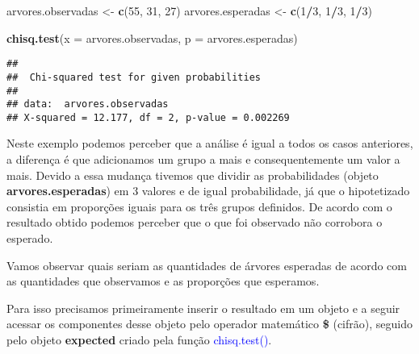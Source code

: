 \documentclass[14pt,titlepage, oneside, openany, a4paper]{book}
\newenvironment{Shaded}{\begin{snugshade}}{\end{snugshade}}
\newcommand{\DataTypeTok}[1]{\textcolor[rgb]{0.13,0.29,0.53}{#1}}
\newcommand{\DecValTok}[1]{\textcolor[rgb]{0.00,0.00,0.81}{#1}}
\newcommand{\KeywordTok}[1]{\textcolor[rgb]{0.13,0.29,0.53}{\textbf{#1}}}
\newcommand{\NormalTok}[1]{#1}
\newcommand{\OperatorTok}[1]{\textcolor[rgb]{0.81,0.36,0.00}{\textbf{#1}}}
\newcommand{\StringTok}[1]{\textcolor[rgb]{0.31,0.60,0.02}{#1}}
\begin{document}
\begin{Shaded}
\begin{Highlighting}[]
\NormalTok{arvores.observadas <-}\StringTok{ }\KeywordTok{c}\NormalTok{(}\DecValTok{55}\NormalTok{, }\DecValTok{31}\NormalTok{, }\DecValTok{27}\NormalTok{)}
\NormalTok{arvores.esperadas <-}\StringTok{ }\KeywordTok{c}\NormalTok{(}\DecValTok{1}\OperatorTok{/}\DecValTok{3}\NormalTok{, }\DecValTok{1}\OperatorTok{/}\DecValTok{3}\NormalTok{, }\DecValTok{1}\OperatorTok{/}\DecValTok{3}\NormalTok{)}

\KeywordTok{chisq.test}\NormalTok{(}\DataTypeTok{x =}\NormalTok{ arvores.observadas, }\DataTypeTok{p =}\NormalTok{ arvores.esperadas)}
\end{Highlighting}
\end{Shaded}

\begin{verbatim}
## 
##  Chi-squared test for given probabilities
## 
## data:  arvores.observadas
## X-squared = 12.177, df = 2, p-value = 0.002269
\end{verbatim}

Neste exemplo podemos perceber que a análise é igual a todos os casos anteriores, a diferença é que adicionamos um grupo a mais e consequentemente um valor a mais. Devido a essa mudança tivemos que dividir as probabilidades (objeto \textbf{arvores.esperadas}) em 3 valores e de igual probabilidade, já que o hipotetizado consistia em proporções iguais para os três grupos definidos. De acordo com o resultado obtido podemos perceber que o que foi observado não corrobora o esperado.

Vamos observar quais seriam as quantidades de árvores esperadas de acordo com as quantidades que observamos e as proporções que esperamos.

Para isso precisamos primeiramente inserir o resultado em um objeto e a seguir acessar os componentes desse objeto pelo operador matemático \textbf{\$} (cifrão), seguido pelo objeto \textbf{expected} criado pela função \textcolor{blue}{chisq.test()}.

\begin{Shaded}
\end{Shaded}
\end{document}
